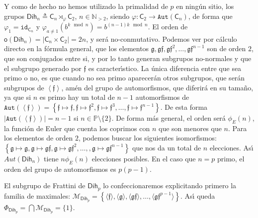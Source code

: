 \documentclass[final,12pt,a4paper,twoside,fleqn]{extbook}
\newcommand{\grclass}[1]{\ensuremath{\mathsf{#1}}}
\newcommand{\cyclicgr}[1]{\ensuremath{{\grclass{C}}_{#1}}}
\newcommand{\dihgr}[1]{\ensuremath{{\grclass{Dih}}_{#1}}}
\theoremstyle{definition}
\theoremstyle{remark}
\begin{document}
Y como de hecho no hemos utilizado la primalidad de $p$ en ning\'un sitio, los grupos $\mathsf{Dih}_{n} \triangleq \cyclicgr{n}\rtimes_{\varphi }\cyclicgr{2}$, $n                   \in \mathds{N}_{{}>2}$, siendo $\varphi : \cyclicgr{2}                    \longrightarrow                    \mathtt{Aut}(\cyclicgr{n})$, de forma que $\varphi_1 = \mathtt{id}_{\cyclicgr{n}}$ y $\varphi_{a                   \neq                    1}(b^{k \mod n}) = b^{(n-1)k \mod n}$. El orden de $\mathsf{o}(\mathsf{Dih}_{n})=\left|\cyclicgr{n}                   \times                    \cyclicgr{2}\right|=2n$, y ser\'a no-conmutativo.
Podemos ver por c\'alculo directo en la f\'ormula general, que los elementos $\mathfrak{g},\mathfrak{gf},\mathfrak{gf}^2, \ldots , \mathfrak{gf}^{n-1}$ son de orden $2$, que son conjugados entre si, y por lo tanto generan subgrupos no-normales y que el subgrupo generado por $\mathfrak{f}$ es caracter{\'{\i}}stico. La \'unica diferencia entre que sea primo o no, es que cuando no sea primo aparecer\'an otros subgrupos, que ser\'an subgrupos de $\left\langle\mathfrak{f}\right\rangle$, am\'en del grupo de automorfismos, que diferir\'a en su tamaño, ya que si $n$ es primo hay un total de $n-1$ automorfismos de $\mathtt{Aut}(\left\langle\mathfrak{f}\right\rangle) = \left\lbrace{\mathfrak{f}                  \mapsto \mathfrak{f},\mathfrak{f}             \mapsto \mathfrak{f}^2,\mathfrak{f}             \mapsto \mathfrak{f}^3,\ldots ,\mathfrak{f}             \mapsto \mathfrak{f}^{n-1} }\right\rbrace$. De esta forma $\left|\mathtt{Aut}(\left\langle\mathfrak{f}\right\rangle)\right|=n-1$ si $n             \in \mathds{P}\setminus\{2\}$. De forma m\'as general, el orden ser\'a $\phi_{E}(n)$, la funci\'on de Euler que cuenta los coprimos con $n$ que son menores que $n$.
Para los elementos de orden $2$, podemos buscar los siguientes isomorfismos: $\left\{{\mathfrak{g}                  \mapsto \mathfrak{g},\mathfrak{g}             \mapsto \mathfrak{g}\mathfrak{f},\mathfrak{g}             \mapsto \mathfrak{g}\mathfrak{f}^2,\ldots,,\mathfrak{g}                  \mapsto \mathfrak{g}\mathfrak{f}^{n-1}}\right\}$ que nos da un total de $n$ elecciones. As{\'{\i}} $Aut(\mathsf{Dih}_{n})$ tiene $n\phi_{E}(n)$ elecciones posibles. En el caso que $n=p$ primo, el orden del grupo de automorfismos es $p(p-1)$.

El subgrupo de Frattini de $\dihgr{p}$ lo confeccionaremos explicitando primero la familia de maximales:
${\mathcal{M}}_{\dihgr{p}} = \left\{ { \langle \mathfrak{f} \rangle,\langle \mathfrak{g} \rangle,\langle
\mathfrak{gf}\rangle,\ldots,\langle \mathfrak{gf}^{p-1}\rangle } \right\} $. As{\'{\i}} queda $\Phi_{\dihgr{p}} =
\bigcap\mathcal{M}_{\dihgr{p}} = \{1\}$.
\end{document}
